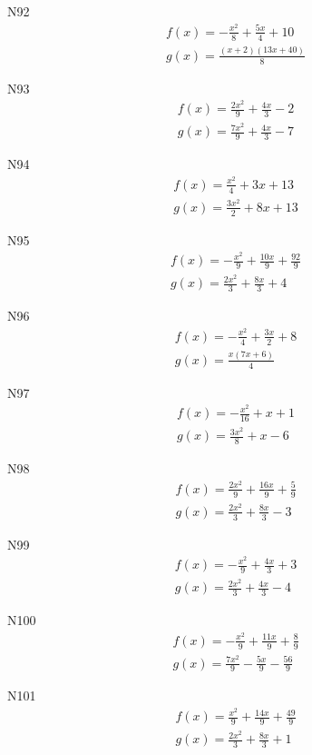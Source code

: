 \documentclass[11pt]{report}
\begin{document}
N92
\begin{align*}
 f(x) = - \frac{x^{2}}{8} + \frac{5 x}{4} + 10\\
 g(x) = \frac{\left(x + 2\right) \left(13 x + 40\right)}{8}
\end{align*}

N93
\begin{align*}
 f(x) = \frac{2 x^{2}}{9} + \frac{4 x}{3} - 2\\
 g(x) = \frac{7 x^{2}}{9} + \frac{4 x}{3} - 7
\end{align*}

N94
\begin{align*}
 f(x) = \frac{x^{2}}{4} + 3 x + 13\\
 g(x) = \frac{3 x^{2}}{2} + 8 x + 13
\end{align*}

N95
\begin{align*}
 f(x) = - \frac{x^{2}}{9} + \frac{10 x}{9} + \frac{92}{9}\\
 g(x) = \frac{2 x^{2}}{3} + \frac{8 x}{3} + 4
\end{align*}

N96
\begin{align*}
 f(x) = - \frac{x^{2}}{4} + \frac{3 x}{2} + 8\\
 g(x) = \frac{x \left(7 x + 6\right)}{4}
\end{align*}

N97
\begin{align*}
 f(x) = - \frac{x^{2}}{16} + x + 1\\
 g(x) = \frac{3 x^{2}}{8} + x - 6
\end{align*}

N98
\begin{align*}
 f(x) = \frac{2 x^{2}}{9} + \frac{16 x}{9} + \frac{5}{9}\\
 g(x) = \frac{2 x^{2}}{3} + \frac{8 x}{3} - 3
\end{align*}

N99
\begin{align*}
 f(x) = - \frac{x^{2}}{9} + \frac{4 x}{3} + 3\\
 g(x) = \frac{2 x^{2}}{3} + \frac{4 x}{3} - 4
\end{align*}

N100
\begin{align*}
 f(x) = - \frac{x^{2}}{9} + \frac{11 x}{9} + \frac{8}{9}\\
 g(x) = \frac{7 x^{2}}{9} - \frac{5 x}{9} - \frac{56}{9}
\end{align*}

N101
\begin{align*}
 f(x) = \frac{x^{2}}{9} + \frac{14 x}{9} + \frac{49}{9}\\
 g(x) = \frac{2 x^{2}}{3} + \frac{8 x}{3} + 1
\end{align*}
\end{document}
